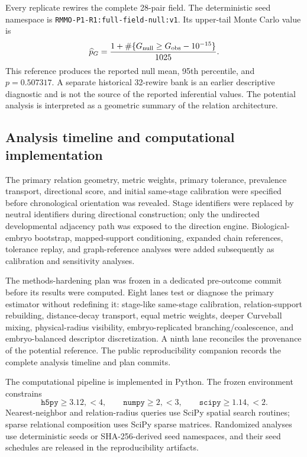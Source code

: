 \documentclass[11pt]{article}
\begin{document}
Every replicate rewires the complete 28-pair field. The deterministic seed namespace is \texttt{RMMO-P1-R1:}\allowbreak\texttt{full-field-null:v1}. Its upper-tail Monte Carlo value is
\[
\widehat p_G
=
\frac{
1+\#\{G_{\rm null}\ge G_{\rm obs}-10^{-15}\}
}{
1025
}.
\]
This reference produces the reported null mean, 95th percentile, and \(p=0.507317\). A separate historical 32-rewire bank is an earlier descriptive diagnostic and is not the source of the reported inferential values. The potential analysis is interpreted as a geometric summary of the relation architecture.

\subsection{Analysis timeline and computational implementation}

The primary relation geometry, metric weights, primary tolerance, prevalence transport, directional score, and initial same-stage calibration were specified before chronological orientation was revealed. Stage identifiers were replaced by neutral identifiers during directional construction; only the undirected developmental adjacency path was exposed to the direction engine. Biological-embryo bootstrap, mapped-support conditioning, expanded chain references, tolerance replay, and graph-reference analyses were added subsequently as calibration and sensitivity analyses.

The methods-hardening plan was frozen in a dedicated pre-outcome commit before its results were computed. Eight lanes test or diagnose the primary estimator without redefining it: stage-like same-stage calibration, relation-support rebuilding, distance-decay transport, equal metric weights, deeper Curveball mixing, physical-radius visibility, embryo-replicated branching/coalescence, and embryo-balanced descriptor discretization. A ninth lane reconciles the provenance of the potential reference. The public reproducibility companion records the complete analysis timeline and plan commits.

The computational pipeline is implemented in Python. The frozen environment constrains
\[
\texttt{h5py}\ge3.12,<4,\qquad
\texttt{numpy}\ge2,<3,\qquad
\texttt{scipy}\ge1.14,<2.
\]
Nearest-neighbor and relation-radius queries use SciPy spatial search routines; sparse relational composition uses SciPy sparse matrices. Randomized analyses use deterministic seeds or SHA-256-derived seed namespaces, and their seed schedules are released in the reproducibility artifacts.
\end{document}
